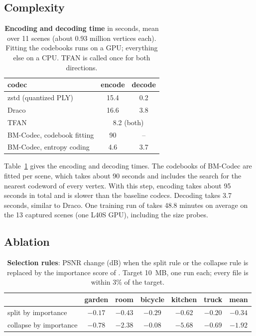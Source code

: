 \subsection{Complexity}
\label{sec:time}

\begin{table}[t]\centering\footnotesize
\caption{\textbf{Encoding and decoding time} in seconds, mean over 11 scenes (about 0.93 million vertices each). Fitting the codebooks runs on a GPU; everything else on a CPU. TFAN is called once for both directions.}
\label{tab:time}
\begin{tabular}{@{}lcc@{}}
\toprule
codec & encode & decode \\
\midrule
zstd (quantized PLY) & 15.4 & 0.2 \\
Draco & 16.6 & 3.8 \\
TFAN & \multicolumn{2}{c}{8.2 (both)} \\
BM-Codec, codebook fitting & 90 & -- \\
BM-Codec, entropy coding & 4.6 & 3.7 \\
\bottomrule
\end{tabular}
\end{table}

Table~\ref{tab:time} gives the encoding and decoding times. The codebooks of BM-Codec are fitted per scene, which takes about 90 seconds and includes the search for the nearest codeword of every vertex. With this step, encoding takes about 95 seconds in total and is slower than the baseline codecs. Decoding takes 3.7 seconds, similar to Draco. One training run of \BM takes 48.8 minutes on average on the 13 captured scenes (one L40S GPU), including the size probes.

\subsection{Ablation}
\label{sec:abl}

\begin{table}[t]\centering\footnotesize
\caption{\textbf{Selection rules}: PSNR change (dB) when the split rule or the collapse rule is replaced by the importance score of \MS. Target 10~MB, one run each; every file is within 3\% of the target.}
\label{tab:abl}
\setlength{\tabcolsep}{3.2pt}
\begin{tabular}{@{}lcccccc@{}}
\toprule
 & garden & room & bicycle & kitchen & truck & mean \\
\midrule
split by importance & $-0.17$ & $-0.43$ & $-0.29$ & $-0.62$ & $-0.20$ & $-0.34$ \\
collapse by importance & $-0.78$ & $-2.38$ & $-0.08$ & $-5.68$ & $-0.69$ & $-1.92$ \\
\bottomrule
\end{tabular}
\end{table}

